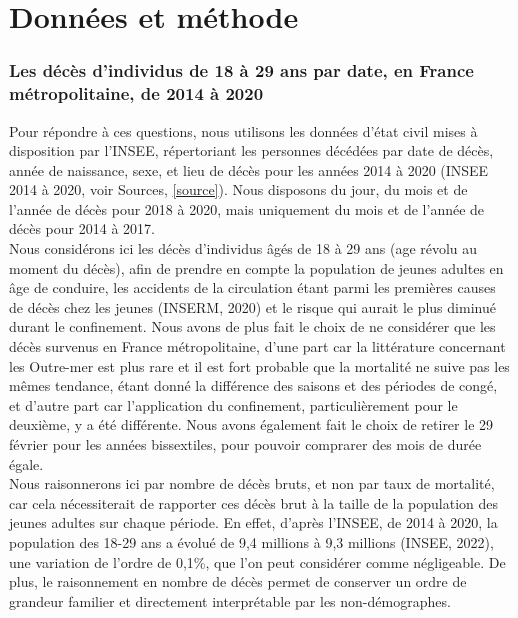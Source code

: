 \documentclass[titlepage]{article}
\begin{document}
\section*{Données et méthode}



\subsubsection*{Les décès d'individus de 18 à 29 ans par date, en France métropolitaine, de 2014 à 2020}

Pour répondre à ces questions, nous utilisons les données d'état civil mises à disposition par l'INSEE, répertoriant les personnes décédées par date de décès, année de naissance, sexe, et lieu de décès pour les années 2014 à 2020 (INSEE 2014 à 2020, voir Sources, \ref{source}). Nous disposons du jour, du mois et de l'année de décès pour 2018 à 2020, mais uniquement du mois et de l'année de décès pour 2014 à 2017. \\

Nous considérons ici les décès d'individus âgés de 18 à 29 ans (age révolu au moment du décès), afin de prendre en compte la population de jeunes adultes en âge de conduire, les accidents de la circulation étant parmi les premières causes de décès chez les jeunes (INSERM, 2020) et le risque qui aurait le plus diminué durant le confinement. Nous avons de plus fait le choix de ne considérer que les décès survenus en France métropolitaine, d'une part car la littérature concernant les Outre-mer est plus rare et il est fort probable que la mortalité ne suive pas les mêmes tendance, étant donné la différence des saisons et des périodes de congé, et d'autre part car l'application du confinement, particulièrement pour le deuxième, y a été différente. Nous avons également fait le choix de retirer le 29 février pour les années bissextiles, pour pouvoir comprarer des mois de durée égale.  \\


Nous raisonnerons ici par nombre de décès bruts, et non par taux de mortalité, car cela nécessiterait de rapporter ces décès brut à la taille de la population des jeunes adultes sur chaque période. En effet, d’après l’INSEE, de 2014 à 2020, la population des 18-29 ans a évolué de 9,4 millions à 9,3 millions (INSEE, 2022), une variation de l’ordre de 0,1\%, que l'on peut considérer comme négligeable. De plus, le raisonnement en nombre de décès permet de conserver un ordre de grandeur familier et directement interprétable par les non-démographes. \\ %
\end{document}
